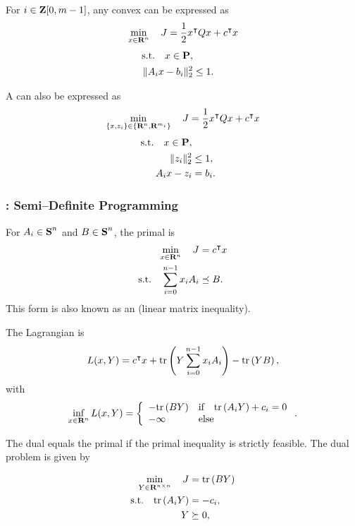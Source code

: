 \documentclass{article}
\begin{document}
For $i\in\textbf{Z}[0,m-1]$, any convex \QCQP can be expressed as 
\begin{align*}
    \min_{x\in\textbf{R}^n}\quad J = \frac{1}{2} x^\intercal Q x + c^\intercal x
\end{align*}
\begin{align*}
    \text{s.t.}\quad x\in\textbf{P},\\
    \|A_i x-b_i\|_2^2&\leq 1.
\end{align*}


A \QCQP can also be expressed as 
\begin{align*}
    \min_{\{x,z_i\}\in\{\textbf{R}^n,\textbf{R}^{m_i}\}}\quad J = \frac{1}{2} x^\intercal Q x + c^\intercal x
\end{align*}
\begin{align*}
    \text{s.t.}\quad x\in\textbf{P},\\
    \|z_i\|_2^2&\leq 1,\\
    A_ix-z_i&=b_i.
\end{align*}

\subsubsection{\SDP: Semi--Definite Programming}

For $A_i\in\textbf{S}^n$ and $B\in\textbf{S}^n$, the primal \SDP is
\begin{align*}
    \min_{x\in\textbf{R}^n}\quad J &= c^\intercal x\\
    \text{s.t.}\quad \sum_{i=0}^{n-1} x_iA_i &\preceq B.
\end{align*}
This form is also known as an \LMI (linear matrix inequality).

The Lagrangian is
\begin{align*}
    L(x,Y)=c^\intercal x +\text{tr}\left(Y\sum_{i=0}^{n-1}x_iA_i\right)-\text{tr}\left(YB\right),
\end{align*}
with
\begin{align*}
    \inf_{x\in\textbf{R}^n} L(x,Y)=\left\{\begin{array}{lllllllllllllllllll}-\text{tr}\left(BY\right) & \text{if}\quad \text{tr}\left(A_iY\right)+c_i=0\\
    -\infty & \text{else}\end{array}\right..
\end{align*}

The dual equals the primal if the primal inequality is strictly feasible.
The dual problem is given by 

\begin{align*}
    \min_{Y\in\textbf{R}^{n\times n}}\quad J &= \text{tr}\left(BY\right)\\
    \text{s.t.}\quad \text{tr}\left(A_iY\right)&=-c_i,\\
    Y&\succeq0,
\end{align*}
\end{document}

